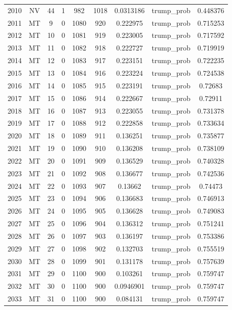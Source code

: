 \documentclass[12pt,a4paper]{article}
\begin{document}
\begin{tabular}{r|cccccccc}
	2010 & NV & 44 & 1 & 982 & 1018 & 0.0313186 & trump\_prob & 0.448376 \\
	2011 & MT & 9 & 0 & 1080 & 920 & 0.222975 & trump\_prob & 0.715253 \\
	2012 & MT & 10 & 0 & 1081 & 919 & 0.223005 & trump\_prob & 0.717592 \\
	2013 & MT & 11 & 0 & 1082 & 918 & 0.222727 & trump\_prob & 0.719919 \\
	2014 & MT & 12 & 0 & 1083 & 917 & 0.223151 & trump\_prob & 0.722235 \\
	2015 & MT & 13 & 0 & 1084 & 916 & 0.223224 & trump\_prob & 0.724538 \\
	2016 & MT & 14 & 0 & 1085 & 915 & 0.223191 & trump\_prob & 0.72683 \\
	2017 & MT & 15 & 0 & 1086 & 914 & 0.222667 & trump\_prob & 0.72911 \\
	2018 & MT & 16 & 0 & 1087 & 913 & 0.223055 & trump\_prob & 0.731378 \\
	2019 & MT & 17 & 0 & 1088 & 912 & 0.222858 & trump\_prob & 0.733634 \\
	2020 & MT & 18 & 0 & 1089 & 911 & 0.136251 & trump\_prob & 0.735877 \\
	2021 & MT & 19 & 0 & 1090 & 910 & 0.136208 & trump\_prob & 0.738109 \\
	2022 & MT & 20 & 0 & 1091 & 909 & 0.136529 & trump\_prob & 0.740328 \\
	2023 & MT & 21 & 0 & 1092 & 908 & 0.136677 & trump\_prob & 0.742536 \\
	2024 & MT & 22 & 0 & 1093 & 907 & 0.13662 & trump\_prob & 0.74473 \\
	2025 & MT & 23 & 0 & 1094 & 906 & 0.136683 & trump\_prob & 0.746913 \\
	2026 & MT & 24 & 0 & 1095 & 905 & 0.136628 & trump\_prob & 0.749083 \\
	2027 & MT & 25 & 0 & 1096 & 904 & 0.136312 & trump\_prob & 0.751241 \\
	2028 & MT & 26 & 0 & 1097 & 903 & 0.136197 & trump\_prob & 0.753386 \\
	2029 & MT & 27 & 0 & 1098 & 902 & 0.132703 & trump\_prob & 0.755519 \\
	2030 & MT & 28 & 0 & 1099 & 901 & 0.131178 & trump\_prob & 0.757639 \\
	2031 & MT & 29 & 0 & 1100 & 900 & 0.103261 & trump\_prob & 0.759747 \\
	2032 & MT & 30 & 0 & 1100 & 900 & 0.0946901 & trump\_prob & 0.759747 \\
	2033 & MT & 31 & 0 & 1100 & 900 & 0.084131 & trump\_prob & 0.759747 \\

\end{tabular}
\end{document}
